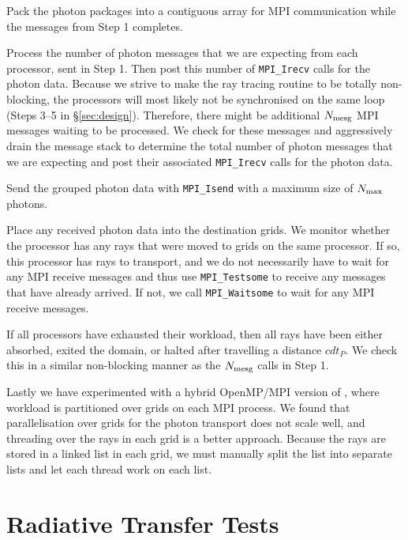 \documentclass[useAMS,usenatbib]{mn2e}
\begin{document}
 Pack the photon packages into a contiguous array for MPI
communication while the messages from Step 1 completes.

 Process the number of photon messages that we are expecting
from each processor, sent in Step 1.  Then post this number of
\texttt{MPI\_Irecv} calls for the photon data.  Because we strive to
make the ray tracing routine to be totally non-blocking, the
processors will most likely not be synchronised on the same loop
(Steps 3--5 in \S\ref{sec:design}).  Therefore, there might be
additional $N_{\rm mesg}$ MPI messages waiting to be processed.  We
check for these messages and aggressively drain the message stack to
determine the total number of photon messages that we are expecting
and post their associated \texttt{MPI\_Irecv} calls for the photon
data.

 Send the grouped photon data with \texttt{MPI\_Isend} with a
maximum size of $N_{\rm max}$ photons.

 Place any received photon data into the destination grids.
We monitor whether the processor has any rays that were moved to grids
on the same processor.  If so, this processor has rays to transport,
and we do not necessarily have to wait for any MPI receive messages
and thus use \texttt{MPI\_Testsome} to receive any messages that have
already arrived.  If not, we call \texttt{MPI\_Waitsome} to wait for
any MPI receive messages.

 If all processors have exhausted their workload, then all
rays have been either absorbed, exited the domain, or halted after
travelling a distance $cdt_P$.  We check this in a similar
non-blocking manner as the $N_{\rm mesg}$ calls in Step 1.

Lastly we have experimented with a hybrid OpenMP/MPI version of \enzo,
where workload is partitioned over grids on each MPI process.  We
found that parallelisation over grids for the photon transport does
not scale well, and threading over the rays in each grid is a better
approach.  Because the rays are stored in a linked list in each grid,
we must manually split the list into separate lists and let each
thread work on each list.

\section{Radiative Transfer Tests}
\label{sec:rt_tests}
\end{document}
